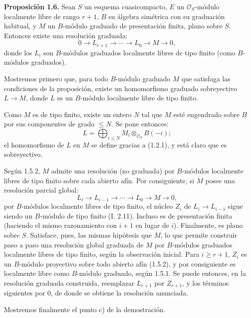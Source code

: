 \textbf{Proposición 1.6.} Sean \(S\) un esquema cuasicompacto, \(E\) un \(\mathcal O_S\)-módulo localmente libre de rango \(r+1\), \(B\) su álgebra simétrica con su graduación habitual, y \(M\) un \(B\)-módulo graduado de presentación finita, plano sobre \(S\). Entonces existe una resolución graduada:
\[
  0\longrightarrow L_{r+1}\longrightarrow\cdots\longrightarrow L_0\longrightarrow M\longrightarrow 0,
\]
donde los \(L_i\) son \(B\)-módulos graduados localmente libres de tipo finito (como \(B\)-módulos graduados).

Mostremos primero que, para todo \(B\)-módulo graduado \(M\) que satisfaga las condiciones de la proposición, existe un homomorfismo graduado sobreyectivo \(L\to M\), donde \(L\) es un \(B\)-módulo localmente libre de tipo finito.

Como \(M\) es de tipo finito, existe un entero \(N\) tal que \(M\) esté engendrado sobre \(B\) por sus componentes de grado \(\leq N\). Se pone entonces:
\[
  L=\bigoplus_{i\leq N} M_i\otimes_{\mathcal O_S}B(-i);
\]
el homomorfismo de \(L\) en \(M\) se define gracias a (1.2.1), y está claro que es sobreyectivo.

Según 1.5.2, \(M\) admite una resolución (no graduada) por \(B\)-módulos localmente libres de tipo finito sobre cada abierto afín. Por consiguiente, si \(M\) posee una resolución parcial global:
\[
  L_i\longrightarrow L_{i-1}\longrightarrow\cdots\longrightarrow L_0\longrightarrow M\longrightarrow 0,
\]
por \(B\)-módulos localmente libres de tipo finito, el núcleo \(Z_i\) de \(L_i\to L_{i-1}\) sigue siendo un \(B\)-módulo de tipo finito (I. 2.11). Incluso es de presentación finita (haciendo el mismo razonamiento con \(i+1\) en lugar de \(i\)). Finalmente, es plano sobre \(S\). Satisface, pues, las mismas hipótesis que \(M\), lo que permite construir paso a paso una resolución global graduada de \(M\) por \(B\)-módulos graduados localmente libres de tipo finito, según la observación inicial. Para \(i\geq r+1\), \(Z_i\) es un \(B\)-módulo proyectivo sobre todo abierto afín (1.5.2), y por consiguiente es localmente libre como \(B\)-módulo graduado, según 1.5.1. Se puede entonces, en la resolución graduada construida, reemplazar \(L_{r+1}\) por \(Z_{r+1}\), y los términos siguientes por \(0\), de donde se obtiene la resolución anunciada.

Mostremos finalmente el punto c) de la demostración.

